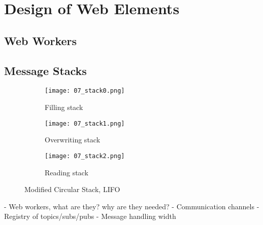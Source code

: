 \chapter{Design of Web Elements}\label{cha:web}

\section{Web Workers}

    

\section{Message Stacks}

    \begin{figure}[htbp]
        \centering
        \begin{subfigure}[t]{0.32\textwidth}
            \texttt{[image: 07\_stack0.png]}
            \caption{Filling stack}
        \end{subfigure}
        \begin{subfigure}[t]{0.32\textwidth}
            \texttt{[image: 07\_stack1.png]}
            \caption{Overwriting stack}
        \end{subfigure}
        \begin{subfigure}[t]{0.32\textwidth}
            \texttt{[image: 07\_stack2.png]}
            \caption{Reading stack}
        \end{subfigure}
        \caption{Modified Circular Stack, \ac{LIFO}}\label{fig:circleStack}
    \end{figure}

- Web workers, what are they? why are they needed?
- Communication channels
- Registry of topics/subs/pubs
- Message handling
width